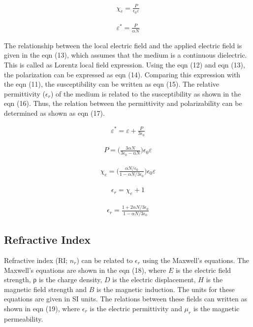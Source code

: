 \begin{align}
\chi_e=\frac{P}{\epsilon_0 \varepsilon}
\end{align}

\begin{align}
\varepsilon^*=\frac{P}{\alpha N}
\end{align}

The relationship between the local electric field and the applied electric field is given in the eqn (13), which assumes that the medium is a continuous dielectric. This is called as Lorentz local field expression. Using the eqn (12) and eqn (13), the polarization can be expressed as eqn (14). Comparing this expression with the eqn (11), the susceptibility can be written as eqn (15). The relative permittivity ($\epsilon_r$) of the medium is related to the susceptibility as shown in the eqn (16). Thus, the relation between the permittivity and polarizability can be determined as shown as eqn (17). 


\begin{align}
\varepsilon^* = \varepsilon + \frac{P}{3\epsilon_0}
\end{align}

\begin{align}
P = \bigg(\frac{3\alpha N}{3\epsilon_0 - \alpha N}\bigg)\epsilon_0 \varepsilon
\end{align}

\begin{align}
\chi_e = \bigg(\frac{\alpha N/\epsilon_0}{1 - \alpha N/3\epsilon_0}\bigg)\epsilon_0 \varepsilon
\end{align}

\begin{align}
\epsilon_r = \chi_e + 1
\end{align}

\begin{align}
\epsilon_r = \frac{1 + 2\alpha N / 3 \epsilon_0}{1 - \alpha N / 3 \epsilon_0}
\end{align}


\subsection{Refractive Index}

Refractive index (RI; $n_r$) can be related to $\epsilon_r$ using the Maxwell’s equations. The Maxwell’s equations are shown in the eqn (18), where $E$ is the electric field strength, ρ is the charge density, $D$ is the electric displacement, $H$ is the magnetic field strength and $B$ is the magnetic induction. The units for these equations are given in SI units. The relations between these fields can written as shown in eqn (19), where $\epsilon_r$ is the electric permittivity and $\mu_r$ is the magnetic permeability. 

